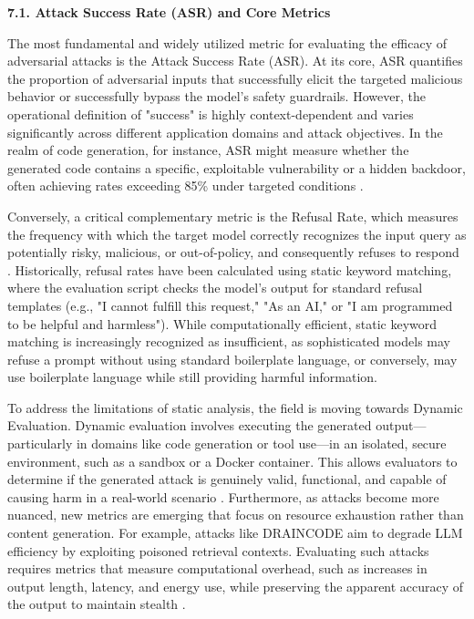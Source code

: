 \documentclass[11pt,a4paper]{article}
\begin{document}
\textbf{7.1. Attack Success Rate (ASR) and Core Metrics}

The most fundamental and widely utilized metric for evaluating the efficacy of adversarial attacks is the Attack Success Rate (ASR). At its core, ASR quantifies the proportion of adversarial inputs that successfully elicit the targeted malicious behavior or successfully bypass the model's safety guardrails. However, the operational definition of "success" is highly context-dependent and varies significantly across different application domains and attack objectives. In the realm of code generation, for instance, ASR might measure whether the generated code contains a specific, exploitable vulnerability or a hidden backdoor, often achieving rates exceeding 85\% under targeted conditions \cite{Wang_2024_LLM}. 

Conversely, a critical complementary metric is the Refusal Rate, which measures the frequency with which the target model correctly recognizes the input query as potentially risky, malicious, or out-of-policy, and consequently refuses to respond \cite{Nie_2025_Secodeplt}. Historically, refusal rates have been calculated using static keyword matching, where the evaluation script checks the model's output for standard refusal templates (e.g., "I cannot fulfill this request," "As an AI," or "I am programmed to be helpful and harmless"). While computationally efficient, static keyword matching is increasingly recognized as insufficient, as sophisticated models may refuse a prompt without using standard boilerplate language, or conversely, may use boilerplate language while still providing harmful information.

To address the limitations of static analysis, the field is moving towards Dynamic Evaluation. Dynamic evaluation involves executing the generated output---particularly in domains like code generation or tool use---in an isolated, secure environment, such as a sandbox or a Docker container. This allows evaluators to determine if the generated attack is genuinely valid, functional, and capable of causing harm in a real-world scenario \cite{Nie_2025_Secodeplt}. Furthermore, as attacks become more nuanced, new metrics are emerging that focus on resource exhaustion rather than content generation. For example, attacks like DRAINCODE aim to degrade LLM efficiency by exploiting poisoned retrieval contexts. Evaluating such attacks requires metrics that measure computational overhead, such as increases in output length, latency, and energy use, while preserving the apparent accuracy of the output to maintain stealth .
\end{document}

